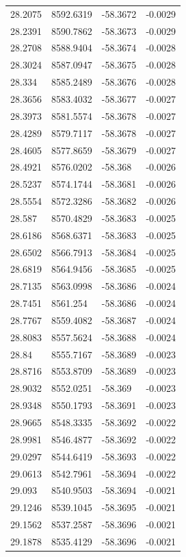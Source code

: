 \begin{table}[H]
\begin{tabular}{llll}
28.2075 & 8592.6319 & -58.3672 & -0.0029 \\
28.2391 & 8590.7862 & -58.3673 & -0.0029 \\
28.2708 & 8588.9404 & -58.3674 & -0.0028 \\
28.3024 & 8587.0947 & -58.3675 & -0.0028 \\
28.334 & 8585.2489 & -58.3676 & -0.0028 \\
28.3656 & 8583.4032 & -58.3677 & -0.0027 \\
28.3973 & 8581.5574 & -58.3678 & -0.0027 \\
28.4289 & 8579.7117 & -58.3678 & -0.0027 \\
28.4605 & 8577.8659 & -58.3679 & -0.0027 \\
28.4921 & 8576.0202 & -58.368 & -0.0026 \\
28.5237 & 8574.1744 & -58.3681 & -0.0026 \\
28.5554 & 8572.3286 & -58.3682 & -0.0026 \\
28.587 & 8570.4829 & -58.3683 & -0.0025 \\
28.6186 & 8568.6371 & -58.3683 & -0.0025 \\
28.6502 & 8566.7913 & -58.3684 & -0.0025 \\
28.6819 & 8564.9456 & -58.3685 & -0.0025 \\
28.7135 & 8563.0998 & -58.3686 & -0.0024 \\
28.7451 & 8561.254 & -58.3686 & -0.0024 \\
28.7767 & 8559.4082 & -58.3687 & -0.0024 \\
28.8083 & 8557.5624 & -58.3688 & -0.0024 \\
28.84 & 8555.7167 & -58.3689 & -0.0023 \\
28.8716 & 8553.8709 & -58.3689 & -0.0023 \\
28.9032 & 8552.0251 & -58.369 & -0.0023 \\
28.9348 & 8550.1793 & -58.3691 & -0.0023 \\
28.9665 & 8548.3335 & -58.3692 & -0.0022 \\
28.9981 & 8546.4877 & -58.3692 & -0.0022 \\
29.0297 & 8544.6419 & -58.3693 & -0.0022 \\
29.0613 & 8542.7961 & -58.3694 & -0.0022 \\
29.093 & 8540.9503 & -58.3694 & -0.0021 \\
29.1246 & 8539.1045 & -58.3695 & -0.0021 \\
29.1562 & 8537.2587 & -58.3696 & -0.0021 \\
29.1878 & 8535.4129 & -58.3696 & -0.0021 \\

\end{tabular}
\end{table}
